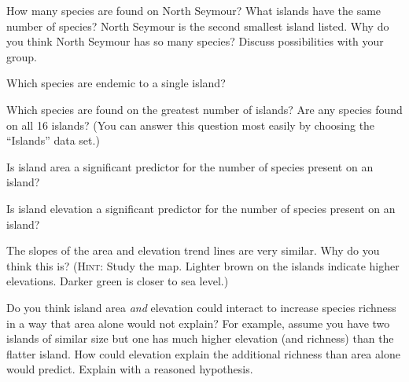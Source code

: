 \documentclass[11pt, addpoints]{exam}
\begin{document}
\begin{questions}
\question[2]
How many species are found on North Seymour? What islands have the same number of species? North Seymour is the second smallest island listed. Why do you think North Seymour has so many species? Discuss possibilities with your group.

\question[2] Which species are endemic to a single island? 

\question[2]
Which species are found on the greatest number of islands? Are any species found on all 16 islands? (You can answer this question most easily by choosing the “Islands” data set.)



\question[2]
Is island area a significant predictor for the number of species present on an island?

\question[2]
Is island elevation a significant predictor for the number of species present on an island?

\question[2]
The slopes of the area and elevation trend lines are very similar. Why do you think this is? (\textsc{Hint:} Study the map. Lighter brown on the islands indicate higher elevations. Darker green is closer to sea level.)

\question[5]
Do you think island area \textit{and} elevation could interact to increase species richness in a way that area alone would not explain? For example, assume you have two islands of similar size but one has much higher elevation (and richness) than the flatter island. How could elevation explain the additional richness than area alone would predict.  Explain with a reasoned hypothesis.

\end{questions}
\end{document}
